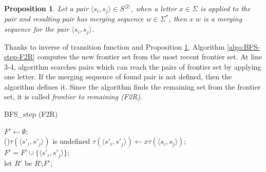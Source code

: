 \documentclass[12pt]{article}
\newtheorem{proposition}{Proposition}[section]
\begin{document}
\begin{proposition}
	\label{prop:merging}
	Let a pair $\langle s_i,s_j \rangle \in S^{\langle 2 \rangle}$, when a letter $x \in \Sigma$ is applied to the pair and resulting pair has merging sequence $w \in \Sigma^*$, then $x\;w$ is a merging sequence for the pair $\langle s_i,s_j \rangle$.
\end{proposition}

Thanks to inverse of transition function and Proposition \ref{prop:merging}, Algorithm \ref{algo:BFS-step-F2R} computes the new frontier set from the most recent frontier set. At line 3-4, algorithm searches pairs which can reach the pairs of frontier set by applying one letter. If the merging sequence of found pair is not defined, then the algorithm defines it. Since the algorithm finds the remaining set from the frontier set, it is called \textit{frontier to remaining (F2R)}. 

\begin{algorithm}[ht]
	\label{algo:BFS-step-F2R}
	\caption{{BFS\_step (F2R)}}
	
	
	$F' \longleftarrow \emptyset$;\\
	{
		{
			{
				\If(){$\tau(\langle s'_i,s'_j\rangle)$ is undefined}
				{
					$\tau(\langle s'_i,s'_j\rangle) \longleftarrow x \tau(\langle s_i,s_j \rangle)$;\\
					$F' = F' \cup \{ \langle s'_i,s'_j\rangle  \} $;\\
				}
			}
		}
	}
	let $R'$ be $R \setminus F'$;
\end{algorithm}
\end{document}
